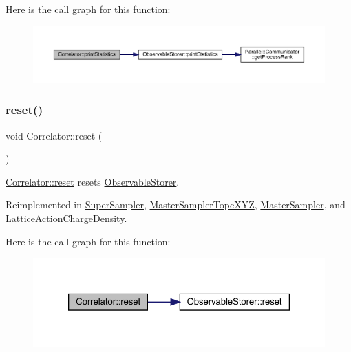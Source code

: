 Here is the call graph for this function\+:
\nopagebreak
\begin{figure}[H]
\begin{center}
\leavevmode
\includegraphics[width=350pt]{class_correlator_a2168d677f547769784781d2e2aaa53cf_cgraph}
\end{center}
\end{figure}
\mbox{\label{class_correlator_aacca40262d2cd62f0a3964e832f948c1}} 
\subsubsection{\texorpdfstring{reset()}{reset()}}
{\footnotesize\ttfamily void Correlator\+::reset (\begin{DoxyParamCaption}{ }\end{DoxyParamCaption})\hspace{0.3cm}{\ttfamily [virtual]}}



\mbox{\hyperlink{class_correlator_aacca40262d2cd62f0a3964e832f948c1}{Correlator\+::reset}} resets \mbox{\hyperlink{class_observable_storer}{Observable\+Storer}}. 



Reimplemented in \mbox{\hyperlink{class_super_sampler_ab2f028561e015500fac1e3093aa4a725}{Super\+Sampler}}, \mbox{\hyperlink{class_master_sampler_topc_x_y_z_aef8d0b1b431711c6410cfece1c007b4a}{Master\+Sampler\+Topc\+X\+YZ}}, \mbox{\hyperlink{class_master_sampler_a275a032513db03c899056fd07d71cc89}{Master\+Sampler}}, and \mbox{\hyperlink{class_lattice_action_charge_density_aebbc2cc72334e7b33d9cce2ad469280b}{Lattice\+Action\+Charge\+Density}}.

Here is the call graph for this function\+:
\nopagebreak
\begin{figure}[H]
\begin{center}
\leavevmode
\includegraphics[width=326pt]{class_correlator_aacca40262d2cd62f0a3964e832f948c1_cgraph}
\end{center}
\end{figure}
\mbox{\label{class_correlator_a35197b1d12b62ef30b79c0138a26456e}} 
